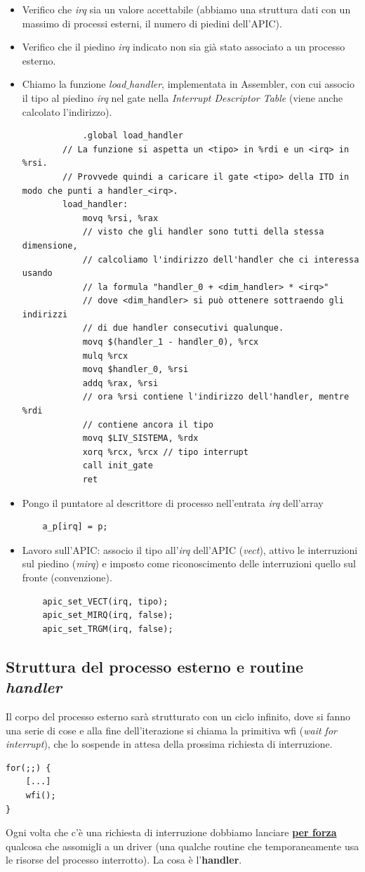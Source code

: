 \documentclass[11pt]{report}
\theoremstyle{definition}
\begin{document}
\begin{itemize}
	\item Verifico che \emph{irq} sia un valore accettabile (abbiamo una struttura dati con un massimo di processi esterni, il numero di piedini dell'APIC).
	\item Verifico che il piedino \emph{irq} indicato non sia già stato associato a un processo esterno.
	\item Chiamo la funzione \emph{load$\_$handler}, implementata in Assembler, con cui associo il tipo al piedino \emph{irq} nel gate nella \emph{Interrupt Descriptor Table} (viene anche calcolato l'indirizzo).
	\small
	\begin{verbatim}
		    .global load_handler
		// La funzione si aspetta un <tipo> in %rdi e un <irq> in %rsi.
		// Provvede quindi a caricare il gate <tipo> della ITD in modo che punti a handler_<irq>.
		load_handler:
		    movq %rsi, %rax
		    // visto che gli handler sono tutti della stessa dimensione,
		    // calcoliamo l'indirizzo dell'handler che ci interessa usando
		    // la formula "handler_0 + <dim_handler> * <irq>" 
		    // dove <dim_handler> si può ottenere sottraendo gli indirizzi
		    // di due handler consecutivi qualunque.
		    movq $(handler_1 - handler_0), %rcx
		    mulq %rcx
		    movq $handler_0, %rsi
		    addq %rax, %rsi
		    // ora %rsi contiene l'indirizzo dell'handler, mentre %rdi
		    // contiene ancora il tipo
		    movq $LIV_SISTEMA, %rdx
		    xorq %rcx, %rcx	// tipo interrupt
		    call init_gate
		    ret
	\end{verbatim}
	\normalsize
	\item Pongo il puntatore al descrittore di processo nell'entrata \emph{irq} dell'array
	\begin{verbatim}
	a_p[irq] = p;
	\end{verbatim}
	\item Lavoro sull'APIC: associo il tipo all'\emph{irq} dell'APIC (\emph{vect}), attivo le interruzioni sul piedino (\emph{mirq}) e imposto come riconoscimento delle interruzioni quello sul fronte (convenzione).
	\begin{verbatim}
	apic_set_VECT(irq, tipo);
	apic_set_MIRQ(irq, false);
	apic_set_TRGM(irq, false); 
	\end{verbatim}
\end{itemize}
\subsection{Struttura del processo esterno e routine \emph{handler}} Il corpo del processo esterno sarà strutturato con un ciclo infinito, dove si fanno una serie di cose e alla fine dell'iterazione si chiama la primitiva wfi (\emph{wait for interrupt}), che lo sospende in attesa della prossima richiesta di interruzione. 
\begin{verbatim}
for(;;) {
    [...]
    wfi();
}
\end{verbatim}
Ogni volta che c'è una richiesta di interruzione dobbiamo lanciare \textbf{\underline{per forza}} qualcosa che assomigli a un driver (una qualche routine che temporaneamente usa le risorse del processo interrotto). La cosa è l'\textbf{handler}. 
\end{document}
